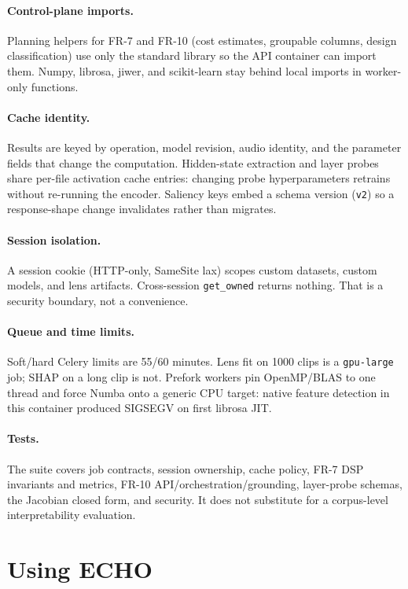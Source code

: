 \documentclass[conference]{IEEEtran}
\begin{document}
\paragraph{Control-plane imports.}
Planning helpers for FR-7 and FR-10 (cost estimates, groupable columns, design classification) use only the standard library so the API container can import them. Numpy, librosa, jiwer, and scikit-learn stay behind local imports in worker-only functions.

\paragraph{Cache identity.}
Results are keyed by operation, model revision, audio identity, and the parameter fields that change the computation. Hidden-state extraction and layer probes share per-file activation cache entries: changing probe hyperparameters retrains without re-running the encoder. Saliency keys embed a schema version (\texttt{v2}) so a response-shape change invalidates rather than migrates.

\paragraph{Session isolation.}
A session cookie (HTTP-only, SameSite lax) scopes custom datasets, custom models, and lens artifacts. Cross-session \texttt{get\_owned} returns nothing. That is a security boundary, not a convenience.

\paragraph{Queue and time limits.}
Soft/hard Celery limits are 55/60 minutes. Lens fit on 1000 clips is a \texttt{gpu-large} job; SHAP on a long clip is not. Prefork workers pin OpenMP/BLAS to one thread and force Numba onto a generic CPU target: native feature detection in this container produced SIGSEGV on first librosa JIT.

\paragraph{Tests.}
The suite covers job contracts, session ownership, cache policy, FR-7 DSP invariants and metrics, FR-10 API/orchestration/grounding, layer-probe schemas, the Jacobian closed form, and security. It does not substitute for a corpus-level interpretability evaluation.

\section{Using ECHO}
\end{document}
